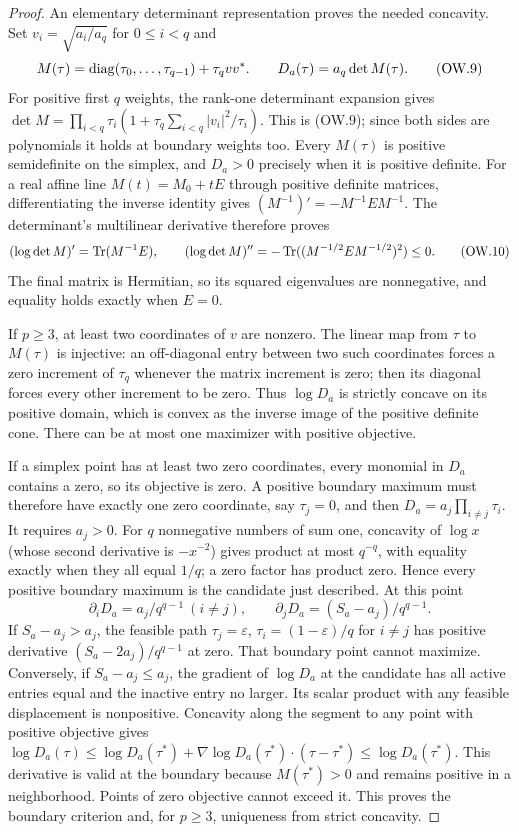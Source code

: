 \begin{proof}
An elementary determinant representation proves the needed concavity.
Set $v_i=\sqrt{a_i/a_q}$ for $0\le i<q$ and
\[
 M(\tau)=\operatorname{diag}(\tau_0,\ldots,\tau_{q-1})+\tau_q vv^*.
 \qquad D_a(\tau)=a_q\det M(\tau).                       \tag{OW.9}
\]
For positive first $q$ weights, the rank-one determinant expansion
gives $\det M=\prod_{i<q}\tau_i(1+\tau_q\sum_{i<q}|v_i|^2/\tau_i)$.
This is (OW.9); since both sides are polynomials it holds at boundary
weights too. Every $M(\tau)$ is positive semidefinite on the simplex,
and $D_a>0$ precisely when it is positive definite.
For a real affine line $M(t)=M_0+tE$ through positive definite
matrices, differentiating the inverse identity gives
$(M^{-1})'=-M^{-1}EM^{-1}$. The determinant's multilinear derivative
therefore proves
\[
 (\log\det M)'=\operatorname{Tr}(M^{-1}E),\qquad
 (\log\det M)''=-\operatorname{Tr}((M^{-1/2}EM^{-1/2})^2)\le0.
 \tag{OW.10}
\]
The final matrix is Hermitian, so its squared eigenvalues are
nonnegative, and equality holds exactly when $E=0$.

If $p\ge3$, at least two coordinates of $v$ are nonzero. The
linear map from $\tau$ to $M(\tau)$ is injective: an off-diagonal
entry between two such coordinates forces a zero increment of
$\tau_q$ whenever the matrix increment is zero; then its diagonal
forces every other increment to be zero. Thus $\log D_a$ is
strictly concave on its positive domain, which is convex as the
inverse image of the positive definite cone. There can be at most
one maximizer with positive objective.

If a simplex point has at least two zero coordinates, every monomial
in $D_a$ contains a zero, so its objective is zero. A positive
boundary maximum must therefore have exactly one zero coordinate,
say $\tau_j=0$, and then
$D_a=a_j\prod_{i\ne j}\tau_i$. It requires $a_j>0$.
For $q$ nonnegative numbers of sum one, concavity of $\log x$
(whose second derivative is $-x^{-2}$) gives product at most $q^{-q}$,
with equality exactly when they all equal $1/q$; a zero factor
has product zero. Hence every positive boundary maximum is the
candidate just described. At this point
\[
 \partial_iD_a=a_j/q^{q-1}\ (i\ne j),\qquad
 \partial_jD_a=(S_a-a_j)/q^{q-1}.                          \tag{OW.11}
\]
If $S_a-a_j>a_j$, the feasible path
$\tau_j=\varepsilon$, $\tau_i=(1-\varepsilon)/q$ for $i\ne j$
has positive derivative $(S_a-2a_j)/q^{q-1}$ at zero. That
boundary point cannot maximize. Conversely, if $S_a-a_j\le a_j$,
the gradient of $\log D_a$ at the candidate has all active entries
equal and the inactive entry no larger. Its scalar product with
any feasible displacement is nonpositive. Concavity along the
segment to any point with positive objective gives
$\log D_a(\tau)\le\log D_a(\tau^*)+
\nabla\log D_a(\tau^*)\cdot(\tau-\tau^*)\le\log D_a(\tau^*)$.
This derivative is valid at the boundary because $M(\tau^*)>0$
and remains positive in a neighborhood. Points of zero objective
cannot exceed it. This proves the boundary criterion and, for
$p\ge3$, uniqueness from strict concavity.


\end{proof}
